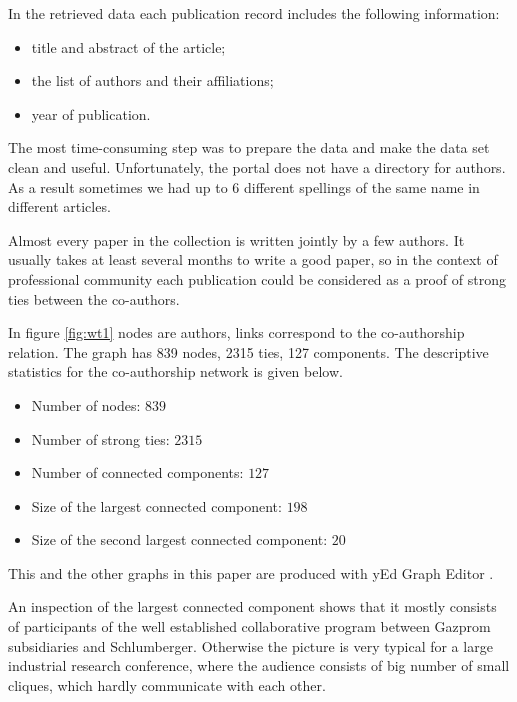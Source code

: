 \documentclass[12pt]{report}
\theoremstyle{definition}
\begin{document}
In the retrieved data each publication record includes the following information:
\begin{itemize}
	\item title and abstract of the article;
	\item the list of authors and their affiliations; 
	\item year of publication.  
\end{itemize}

The most time-consuming step was to prepare the data and make the data set clean and useful. 
Unfortunately, the portal does not have a directory for authors. 
As a result sometimes we had up to 6 different spellings of the same name in different articles.

Almost every paper in the collection is written jointly by a few authors. It usually takes at least several months to write a good paper, so in the context of professional community each publication could be considered as a proof of strong ties between the co-authors.


In figure \ref{fig:wt1} nodes are authors, links correspond to the co-authorship relation. The graph has 839 nodes, 2315 ties, 127 components.
The descriptive statistics for the co-authorship network is given below.

\begin{itemize}
	\item Number of nodes: $839$
	\item Number of strong ties: $2315$
	\item Number of connected components: $127$
	\item Size of the largest connected component: $198$
	\item Size of the second largest connected component: $20$
\end{itemize}

This and the other graphs in this paper are produced with yEd Graph Editor \cite{wiese2004yfiles}.

An inspection of the largest connected component shows that it mostly consists of participants of the well established collaborative program between Gazprom subsidiaries and Schlumberger. Otherwise the picture is very typical for a large industrial research conference, where the audience consists of big number of small cliques, which hardly communicate with each other.
\end{document}
